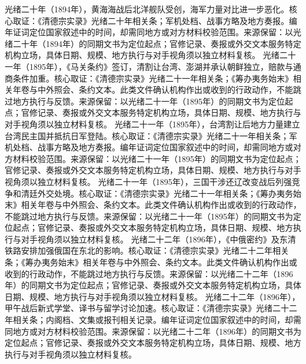 光绪二十年（1894年），黄海海战后北洋舰队受创，海军力量对比进一步恶化。核心取证：《清德宗实录》光绪二十年相关条；军机处档、战事方略及地方奏报。编年证词定位国家叙述中的时间，却需同地方或对方材料校验范围。来源保留：以光绪二十年（1894年）的同期文书为定位起点；官修记录、奏报或外交文本服务特定机构立场，具体日期、规模、地方执行与对手视角须以独立材料复核。
光绪二十一年（1895年），《马关条约》签订，清割让台湾、澎湖并承认朝鲜独立，赔款与通商条件加重。核心取证：《清德宗实录》光绪二十一年相关条；《筹办夷务始末》相关年卷与中外照会、条约文本。此类文件确认机构作出或收到的行政动作，不能跳过地方执行与反馈。来源保留：以光绪二十一年（1895年）的同期文书为定位起点；官修记录、奏报或外交文本服务特定机构立场，具体日期、规模、地方执行与对手视角须以独立材料复核。
光绪二十一年（1895年），台湾割让后地方力量建立台湾民主国并抵抗日军登陆。核心取证：《清德宗实录》光绪二十一年相关条；军机处档、战事方略及地方奏报。编年证词定位国家叙述中的时间，却需同地方或对方材料校验范围。来源保留：以光绪二十一年（1895年）的同期文书为定位起点；官修记录、奏报或外交文本服务特定机构立场，具体日期、规模、地方执行与对手视角须以独立材料复核。
光绪二十一年（1895年），三国干涉还辽改变战后列强竞争和清廷外交处境。核心取证：《清德宗实录》光绪二十一年相关条；《筹办夷务始末》相关年卷与中外照会、条约文本。此类文件确认机构作出或收到的行政动作，不能跳过地方执行与反馈。来源保留：以光绪二十一年（1895年）的同期文书为定位起点；官修记录、奏报或外交文本服务特定机构立场，具体日期、规模、地方执行与对手视角须以独立材料复核。
光绪二十二年（1896年），《中俄密约》及东清铁路安排加强俄国在东北的影响。核心取证：《清德宗实录》光绪二十二年相关条；《筹办夷务始末》相关年卷与中外照会、条约文本。此类文件确认机构作出或收到的行政动作，不能跳过地方执行与反馈。来源保留：以光绪二十二年（1896年）的同期文书为定位起点；官修记录、奏报或外交文本服务特定机构立场，具体日期、规模、地方执行与对手视角须以独立材料复核。
光绪二十二年（1896年），甲午战后新式学堂、译书与留学讨论加速。核心取证：《清德宗实录》光绪二十二年相关条；内阁档、文集或报刊相关记录。编年证词定位国家叙述中的时间，却需同地方或对方材料校验范围。来源保留：以光绪二十二年（1896年）的同期文书为定位起点；官修记录、奏报或外交文本服务特定机构立场，具体日期、规模、地方执行与对手视角须以独立材料复核。
